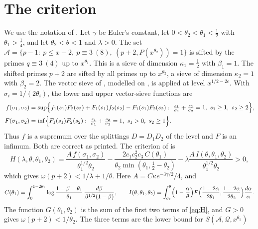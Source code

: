 \documentclass[11pt,a4paper]{amsart}
\theoremstyle{remark}
\numberwithin{equation}{section}
\begin{document}
\section{The criterion}\label{sec:criterion}

We use the notation of \cite{NX}. Let $\gamma$ be Euler's constant, let $0<\theta_2<\theta_1<\frac12$ with
$\theta_1>\frac14$, and let $\theta_2<\theta<1$ and $\lambda>0$. The set $\mathcal A=\{p-1:\ p\le x-2,\ p\equiv3\
(8),\ (p+2,P(x^{\theta_2}))=1\}$ is sifted by the primes $q\equiv3\ (4)$ up to $x^{\theta_1}$. This is a sieve of
dimension $\kappa_1=\frac12$ with $\beta_1=1$. The shifted primes $p+2$ are sifted by all primes up to
$x^{\theta_2}$, a sieve of dimension $\kappa_2=1$ with $\beta_2=2$. The vector sieve of \cite[Proposition~3.10]{NX}, modelled on \cite[\S3.3]{HBL}, is applied at level
$x^{1/2-2\epsilon}$. With $\sigma_i=1/(2\theta_i)$, the lower and upper vector-sieve functions are
\cite[(3.13), (3.14), (5.1)]{NX}
\begin{align}
f(\sigma_1,\sigma_2)&=\sup\Bigl\{f_1(s_1)F_2(s_2)+F_1(s_1)f_2(s_2)-F_1(s_1)F_2(s_2):\
\tfrac{s_1}{\sigma_1}+\tfrac{s_2}{\sigma_2}=1,\ s_1\ge1,\ s_2\ge2\Bigr\},\label{eq:f}\\
F(\sigma_1,\sigma_2)&=\inf\Bigl\{F_1(s_1)F_2(s_2):\ \tfrac{s_1}{\sigma_1}+\tfrac{s_2}{\sigma_2}=1,\ s_1>0,\
s_2\ge1\Bigr\}.\label{eq:F}
\end{align}
Thus $f$ is a supremum over the splittings $D=D_1D_2$ of the level and $F$ is an infimum. Both are correct as
printed. The criterion of \cite[\S5]{NX} is
\begin{equation}\label{eq:H}
H(\lambda,\theta,\theta_1,\theta_2)=\frac{A\,f(\sigma_1,\sigma_2)}{\theta_1^{1/2}\theta_2}
-\frac{2c_1c_2^2c_3\,C(\theta_1)}{\theta_2\min(\theta_1,\frac12-\theta_2)}
-\lambda\frac{A\,I(\theta,\theta_1,\theta_2)}{\theta_1^{1/2}\theta_2}>0,
\end{equation}
which gives $\omega(p+2)<1/\lambda+1/\theta$. Here $A=C\kappa e^{-3\gamma/2}/4$, and
\begin{equation}\label{eq:CI}
C(\theta_1)=\int_0^{1-2\theta_1}\log\frac{1-\beta-\theta_1}{\theta_1}\,\frac{d\beta}{\beta^{1/2}(1-\beta)},\qquad
I(\theta,\theta_1,\theta_2)=\int_{\theta_2}^{\theta}\Bigl(1-\frac\alpha\theta\Bigr)
F\Bigl(\frac{1-2\alpha}{2\theta_1},\frac{1-2\alpha}{2\theta_2}\Bigr)\frac{d\alpha}\alpha .
\end{equation}
The function $G(\theta_1,\theta_2)$ is the sum of the first two terms of \eqref{eq:H}, and $G>0$ gives
$\omega(p+2)<1/\theta_2$. The three terms are the lower bound for $S(\mathcal A,\mathcal Q,x^{\theta_1})$
\end{document}
